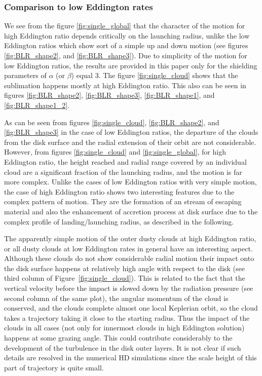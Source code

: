 \documentclass[twocolumn]{aastex62}
\begin{document}
\subsubsection{Comparison to low Eddington rates}

We see from the figure \ref{fig:single_global} that the character of the motion for high Eddington ratio depends critically on the launching radius, unlike the low Eddington ratios which show sort of a simple up and down motion (see figures \ref{fig:BLR_shape2}, and \ref{fig:BLR_shape3}).
Due to simplicity of the motion for low Eddington ratios, the results are provided in this paper only for the shielding parameters of $\alpha$ (or $\beta$) equal 3.
The figure \ref{fig:single_cloud} shows that the sublimation happens mostly at high Eddington ratio. This also can be seen in figures \ref{fig:BLR_shape2}, \ref{fig:BLR_shape3}, \ref{fig:BLR_shape1}, and \ref{fig:BLR_shape1_2}.

As can be seen from figures \ref{fig:single_cloud}, \ref{fig:BLR_shape2}, and \ref{fig:BLR_shape3} in the case of low Eddington ratios, the departure of the clouds from the disk surface and the radial extension of their orbit are not considerable. However, from figures \ref{fig:single_cloud} and \ref{fig:single_global}, for high Eddington ratio, the height reached and radial range covered by an individual cloud are a significant fraction of the launching radius, and the motion is far more complex. Unlike the cases of low Eddington ratios with very simple motion, the case of high Eddington ratio shows two interesting features due to the complex pattern of motion. They are the formation of an stream of escaping material and also the enhancement of accretion process at disk surface due to the complex profile of landing/launching radius, as described in the following. 

The apparently simple motion of the outer dusty clouds at high Eddington ratio, or all dusty clouds at low Eddington rates in general have an interesting aspect. Although these clouds do not show considerable radial motion their impact onto the disk surface happens at relatively high angle with respect to the disk (see third column of Figure~\ref{fig:single_cloud}). This is related to the fact that the vertical velocity before the impact is slowed down by the radiation pressure (see second column of the same plot), the angular momentum of the cloud is conserved, and the clouds complete almost one local Keplerian orbit, so the cloud takes a trajectory taking it close to the starting radius. Thus the impact of the clouds in all cases (not only for innermost clouds in high Eddington solution) happens at some grazing angle. This could contribute considerably to the development of the turbulence in the disk outer layers. It is not clear if such details are resolved in the numerical HD simulations since the scale height of this part of trajectory is quite small.
\end{document}
